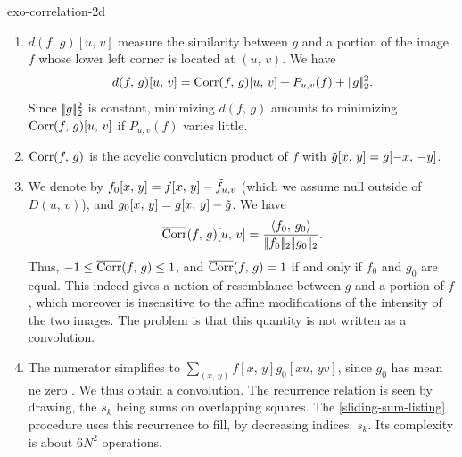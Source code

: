  
\begin{correction}{exo-correlation-2d}
\begin{enumerate}
\item $ d (f, \, g) [u, \, v] $ measure the similarity between $ g $ and a portion of the image $ f $ whose lower left corner is located at $ (u, \, v) $. We have
\begin{equation*}
d (f, \, g) [u, \, v] = \operatorname{Corr} (f, \, g) [u, \, v] + P_{u, v} (f) + |\!| g |\!|_2^2.
\end{equation*}
Since $ |\!| g |\!|_2^2 $ is constant, minimizing $ d (f, \, g) $ amounts to minimizing $ \operatorname{Corr} (f, \, g) [u, \, v] $ if $ P_{u, v} (f) $ varies little.
\item {} $ \operatorname{Corr} (f, \, g) $ is the acyclic convolution product of $ f $ with $ \tilde{g}[x, \, y] = g [-x, \, - y] $.
\item We denote by $ f_0 [x, \, y] = f [x, \, y] - \tilde{f}_{u, v} $ (which we assume null outside of $ D (u, \, v) $), and $ g_0 [x, \, y] = g [x, \, y] - \tilde{g} $. We have
\begin{equation*}
\overline{\operatorname{Corr}} (f, \, g) [u, \, v] = \frac{\langle f_0,\,g_0\rangle}{|\!| f_0 |\!|_2 |\!| g_0 |\!|_2}.
\end{equation*}
Thus, $ -1 \leq \overline{\operatorname{Corr}} (f, \, g) \leq 1 $, and $ \overline{\operatorname{Corr}} (f, \, g) = 1 $ if and only if $ f_0 $ and $ g_0 $ are equal. This indeed gives a notion of resemblance between $ g $ and a portion of $ f $, which moreover is insensitive to the affine modifications of the intensity of the two images. The problem is that this quantity is not written as a convolution.
\item The numerator simplifies to $ \sum_{(x, \, y)}{f [x, \, y] g_0 [xu, \, yv]} $, since $ g_0 $ has mean \-ne zero . We thus obtain a convolution. The recurrence relation is seen by drawing, the $ s_k $ being sums on overlapping squares. The \Matlab{} \ref{sliding-sum-listing} procedure uses this recurrence to fill, by decreasing indices, $ s_k $. Its complexity is about $ 6N^2 $ operations.


\end{enumerate}
\end{correction}
